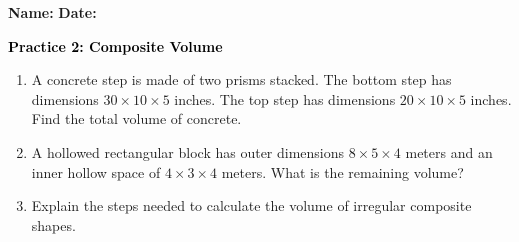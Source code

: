 \documentclass[12pt, letterpaper, fleqn]{article}
\begin{document}
\textbf{Name:} \underline{\hspace{5cm}}
\hfill
\textbf{Date:} \underline{\hspace{3cm}}\\

\begin{tcolorbox}[colback=customteal!20]
    \large\textcolor{black}{\textbf{Practice 2: Composite Volume}}
\end{tcolorbox}
\begin{enumerate}[itemsep=3.5cm, leftmargin=0.6cm]
\item A concrete step is made of two prisms stacked. The bottom step has dimensions $30 \times 10 \times 5$ inches. The top step has dimensions $20 \times 10 \times 5$ inches. Find the total volume of concrete.
\vspace{3.5cm}
\item A hollowed rectangular block has outer dimensions $8 \times 5 \times 4$ meters and an inner hollow space of $4 \times 3 \times 4$ meters. What is the remaining volume?
\vspace{3.5cm}
\item Explain the steps needed to calculate the volume of irregular composite shapes.
\end{enumerate}
\end{document}

